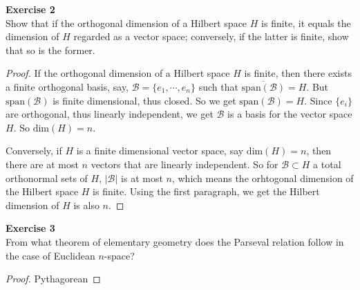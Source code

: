 \documentclass[12pt, a4paper]{article}
\theoremstyle{plain}
\newcommand{\B}{\mathscr{B}}
\newenvironment{exercise}[2][Exercise]
    { \begin{mdframed}[backgroundcolor=gray!20] \textbf{#1 #2} \\}
    {  \end{mdframed}}
\begin{document}
\begin{exercise}{2}
Show that if the orthogonal dimension of a Hilbert space $H$ is finite, it equals the dimension of $H$ regarded as a vector space; conversely, if the latter is finite, show that so is the former.
\end{exercise}
	\begin{proof}
	If the orthogonal dimension of a Hilbert space $H$ is finite, then there exists a finite orthogonal basis, say, $\B=\{e_1,\cdots, e_n\}$ such that $\overline{\text{span}(\B)}=H$. But $\text{span}(\B)$ is finite dimensional, thus closed. So we get $\text{span}(\B)=H$. Since $\{e_i\}$ are orthogonal, thus linearly independent, we get $\B$ is a basis for the vector space $H$. So $\text{dim}(H) = n$.
	
	Conversely, if $H$ is a finite dimensional vector space, say $\text{dim}(H)=n$, then there are at most $n$ vectors that are linearly independent. So for $\B\subset H$ a total orthonormal sets of $H$, $|\B|$ is at most $n$, which means the orhtogonal dimension of the Hilbert space $H$ is finite. Using the first paragraph, we get the Hilbert dimension of $H$ is also $n$.
	\end{proof}
	
\begin{exercise}{3}
From what theorem of elementary geometry does the Parseval relation follow in the case of Euclidean $n$-space?
\end{exercise}
	\begin{proof}
	Pythagorean
	\end{proof}
	
\end{document}
